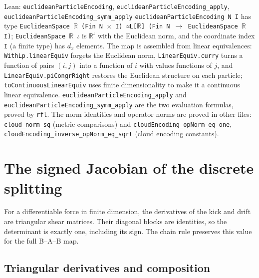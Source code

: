 \documentclass[11pt,a4paper]{report}
\begin{document}
\begin{leanbox}{Lean: \texttt{euclideanParticleEncoding}, \texttt{euclideanParticleEncoding\_\allowbreak{}apply}, \texttt{euclideanParticleEncoding\_\allowbreak{}symm\_\allowbreak{}apply}}
\texttt{euclidean\allowbreak{}Particle\allowbreak{}Encoding N I} has type \texttt{Euclidean\allowbreak{}Space \ensuremath{\mathbb R} (Fin N \ensuremath{\times} I) ≃L[\ensuremath{\mathbb R}] (Fin N \ensuremath{\to} Euclidean\allowbreak{}Space \ensuremath{\mathbb R} I)}; \texttt{Euclidean\allowbreak{}Space \ensuremath{\mathbb R} \ensuremath{\iota}} is \(\mathbb R^\iota\) with the Euclidean norm, and the coordinate index \texttt{I} (a finite type) has \(d_x\) elements. The map is assembled from linear equivalences: \texttt{With\allowbreak{}Lp.\allowbreak{}linear\allowbreak{}Equiv} forgets the Euclidean norm, \texttt{Linear\allowbreak{}Equiv.\allowbreak{}curry} turns a function of pairs \((i,j)\) into a function of \(i\) with values functions of \(j\), and \texttt{Linear\allowbreak{}Equiv.\allowbreak{}pi\allowbreak{}Congr\allowbreak{}Right} restores the Euclidean structure on each particle; \texttt{to\allowbreak{}Continuous\allowbreak{}Linear\allowbreak{}Equiv} uses finite dimensionality to make it a continuous linear equivalence. \texttt{euclidean\allowbreak{}Particle\allowbreak{}Encoding\_\allowbreak{}apply} and \texttt{euclidean\allowbreak{}Particle\allowbreak{}Encoding\_\allowbreak{}symm\_\allowbreak{}apply} are the two evaluation formulas, proved by \texttt{rfl}. The norm identities and operator norms are proved in other files: \texttt{cloud\_\allowbreak{}norm\_\allowbreak{}sq} (metric comparisons) and \texttt{cloud\allowbreak{}Encoding\_\allowbreak{}op\allowbreak{}Norm\_\allowbreak{}eq\_\allowbreak{}one}, \texttt{cloud\allowbreak{}Encoding\_\allowbreak{}inverse\_\allowbreak{}op\allowbreak{}Norm\_\allowbreak{}eq\_\allowbreak{}sqrt} (cloud encoding constants).
\end{leanbox}
\section{\texorpdfstring{The signed Jacobian of the discrete splitting}{The signed Jacobian of the discrete splitting}}


For a differentiable force in finite dimension, the derivatives of the kick and drift are triangular shear matrices. Their diagonal blocks are identities, so the determinant is exactly one, including its sign. The chain rule preserves this value for the full B–A–B map.

\subsection{\texorpdfstring{Triangular derivatives and composition}{Triangular derivatives and composition}}
\end{document}
